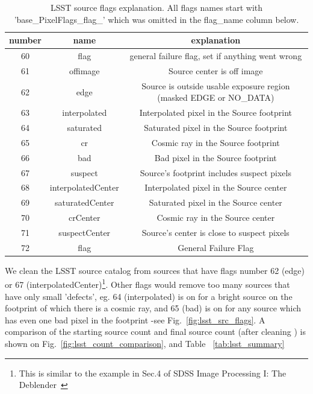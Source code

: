 \documentclass[DM,lsstdraft,toc,usenatbib]{lsstdoc}
\begin{document}
\begin{table}
\centering
\caption{LSST source flags explanation. All flags names start with 'base\_PixelFlags\_flag\_' which was omitted in the flag\_name column below. }
\label{tab:lsst_src_flags}
\begin{tabular}{ccc}
\hline
number & name & explanation \\
\hline
60 & flag & general failure flag, set if anything went wrong \\
61 & offimage & Source center is off image \\
62 & edge & Source is outside usable exposure region (masked EDGE or NO\_DATA) \\
63 & interpolated & Interpolated pixel in the Source footprint \\
64 & saturated & Saturated pixel in the Source footprint \\
65 & cr & Cosmic ray in the Source footprint \\
66 & bad & Bad pixel in the Source footprint \\
67 & suspect & Source's footprint includes suspect pixels \\
68 & interpolatedCenter & Interpolated pixel in the Source center \\
69 & saturatedCenter & Saturated pixel in the Source center \\
70 & crCenter & Cosmic ray in the Source center \\
71 & suspectCenter & Source's center is close to suspect pixels \\
72 & flag & General Failure Flag \\
\hline
\end{tabular}
\end{table}

We clean the LSST source catalog from sources that have flags number 62 (edge) or 67 (interpolatedCenter)\footnote{This is similar to the example in Sec.4 of SDSS Image Processing I: The Deblender~\citep{lupton2005}}. Other flags would remove too many sources that have only small 'defects', eg. 64 (interpolated) is on for a bright source on the footprint of which there is a cosmic ray, and 65 (bad) is on for any source which has even one bad pixel in the footprint -see Fig.~\ref{fig:lsst_src_flags}. A comparison of the starting source count and final source count (after cleaning ) is shown on Fig.~\ref{fig:lsst_count_comparison}, and Table ~\ref{tab:lsst_summary}
\end{document}
